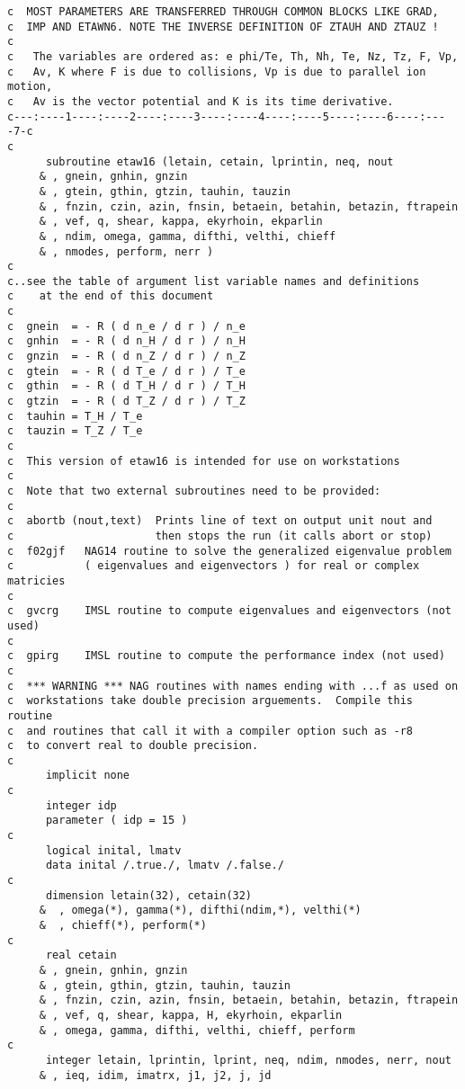 \begin{verbatim}
c  MOST PARAMETERS ARE TRANSFERRED THROUGH COMMON BLOCKS LIKE GRAD,
c  IMP AND ETAWN6. NOTE THE INVERSE DEFINITION OF ZTAUH AND ZTAUZ !
c
c   The variables are ordered as: e phi/Te, Th, Nh, Te, Nz, Tz, F, Vp, 
c   Av, K where F is due to collisions, Vp is due to parallel ion motion,
c   Av is the vector potential and K is its time derivative.
c---:----1----:----2----:----3----:----4----:----5----:----6----:----7-c
c
      subroutine etaw16 (letain, cetain, lprintin, neq, nout
     & , gnein, gnhin, gnzin
     & , gtein, gthin, gtzin, tauhin, tauzin
     & , fnzin, czin, azin, fnsin, betaein, betahin, betazin, ftrapein
     & , vef, q, shear, kappa, ekyrhoin, ekparlin
     & , ndim, omega, gamma, difthi, velthi, chieff
     & , nmodes, perform, nerr )
c
c..see the table of argument list variable names and definitions
c    at the end of this document
c
c  gnein  = - R ( d n_e / d r ) / n_e
c  gnhin  = - R ( d n_H / d r ) / n_H
c  gnzin  = - R ( d n_Z / d r ) / n_Z
c  gtein  = - R ( d T_e / d r ) / T_e
c  gthin  = - R ( d T_H / d r ) / T_H
c  gtzin  = - R ( d T_Z / d r ) / T_Z
c  tauhin = T_H / T_e
c  tauzin = T_Z / T_e
c
c  This version of etaw16 is intended for use on workstations
c
c  Note that two external subroutines need to be provided:
c
c  abortb (nout,text)  Prints line of text on output unit nout and
c                      then stops the run (it calls abort or stop)
c  f02gjf   NAG14 routine to solve the generalized eigenvalue problem
c           ( eigenvalues and eigenvectors ) for real or complex matricies
c
c  gvcrg    IMSL routine to compute eigenvalues and eigenvectors (not used)
c
c  gpirg    IMSL routine to compute the performance index (not used)
c
c  *** WARNING *** NAG routines with names ending with ...f as used on
c  workstations take double precision arguements.  Compile this routine
c  and routines that call it with a compiler option such as -r8
c  to convert real to double precision.
c
      implicit none
c
      integer idp
      parameter ( idp = 15 )
c
      logical inital, lmatv
      data inital /.true./, lmatv /.false./
c
      dimension letain(32), cetain(32)
     &  , omega(*), gamma(*), difthi(ndim,*), velthi(*)
     &  , chieff(*), perform(*)
c
      real cetain
     & , gnein, gnhin, gnzin
     & , gtein, gthin, gtzin, tauhin, tauzin
     & , fnzin, czin, azin, fnsin, betaein, betahin, betazin, ftrapein
     & , vef, q, shear, kappa, H, ekyrhoin, ekparlin
     & , omega, gamma, difthi, velthi, chieff, perform
c
      integer letain, lprintin, lprint, neq, ndim, nmodes, nerr, nout
     & , ieq, idim, imatrx, j1, j2, j, jd

\end{verbatim}

